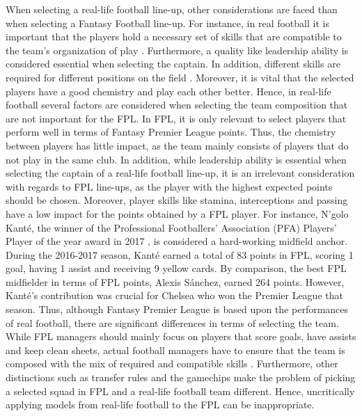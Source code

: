 \newpar

When selecting a real-life football line-up, other considerations are faced than when selecting a Fantasy Football line-up. For instance, in real football it is important that the players hold a necessary set of skills that are compatible to the team's organization of play \citep{Pantuso}. Furthermore, a quality like leadership ability is considered essential when selecting the captain. In addition, different skills are required for different positions on the field \citep{Boon}. Moreover, it is vital that the selected players have a good chemistry and play each other better. Hence, in real-life football several factors are considered when selecting the team composition that are not important for the FPL. In FPL, it is only relevant to select players that perform well in terms of Fantasy Premier League points. Thus, the chemistry between players has little impact, as the team mainly consists of players that do not play in the same club. In addition, while leadership ability is essential when selecting the captain of a real-life football line-up, it is an irrelevant consideration with regards to FPL line-ups, as the player with the highest expected points should be chosen. Moreover, player skills like stamina, interceptions and passing have a low impact for the points obtained by a FPL player. For instance, N'golo Kant\'e, the winner of the Professional Footballers' Association (PFA) Players' Player of the year award in 2017 \citep{Skysports_Kante}, is considered a hard-working midfield anchor. During the 2016-2017 season, Kant\'e earned a total of 83 points in FPL, scoring 1 goal, having 1 assist and receiving 9 yellow cards. By comparison, the best FPL midfielder in terms of FPL points, Alexis Sánchez, earned 264 points. However, Kant\'e's contribution was crucial for Chelsea who won the Premier League that season. Thus, although Fantasy Premier League is based upon the performances of real football, there are significant differences in terms of selecting the team. While FPL managers should mainly focus on players that score goals, have assists and keep clean sheets, actual football managers have to ensure that the team is composed with the mix of required and compatible skills \citep{Pantuso}. Furthermore, other distinctions such as transfer rules and the gamechips make the problem of picking a selected squad in FPL and a real-life football team different. Hence, uncritically applying models from real-life football to the FPL can be inappropriate.



